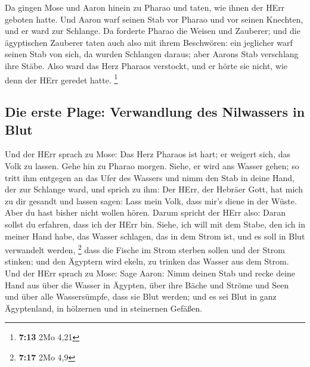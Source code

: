  Da gingen Mose und Aaron hinein zu Pharao und taten, wie
ihnen der HErr geboten hatte. Und Aaron warf seinen Stab vor Pharao und
vor seinen Knechten, und er ward zur Schlange.  Da
forderte Pharao die Weisen und Zauberer; und die ägyptischen Zauberer
taten auch also mit ihrem Beschwören:  ein jeglicher warf
seinen Stab von sich, da wurden Schlangen daraus; aber Aarons Stab
verschlang ihre Stäbe.  Also ward das Herz Pharaos
verstockt, und er hörte sie nicht, wie denn der HErr geredet hatte.
\footnote{\textbf{7:13} 2Mo 4,21}

\hypertarget{die-erste-plage-verwandlung-des-nilwassers-in-blut}{%
\subsection{Die erste Plage: Verwandlung des Nilwassers in
Blut}\label{die-erste-plage-verwandlung-des-nilwassers-in-blut}}

 Und der HErr sprach zu Mose: Das Herz Pharaos ist hart;
er weigert sich, das Volk zu lassen.  Gehe hin zu Pharao
morgen. Siehe, er wird ans Wasser gehen; so tritt ihm entgegen an das
Ufer des Wassers und nimm den Stab in deine Hand, der zur Schlange ward,
 und sprich zu ihm: Der HErr, der Hebräer Gott, hat mich
zu dir gesandt und lassen sagen: Lass mein Volk, dass mir's diene in der
Wüste. Aber du hast bisher nicht wollen hören.  Darum
spricht der HErr also: Daran sollst du erfahren, dass ich der HErr bin.
Siehe, ich will mit dem Stabe, den ich in meiner Hand habe, das Wasser
schlagen, das in dem Strom ist, und es soll in Blut verwandelt werden,
\footnote{\textbf{7:17} 2Mo 4,9}  dass die Fische im
Strom sterben sollen und der Strom stinken; und den Ägyptern wird ekeln,
zu trinken das Wasser aus dem Strom.  Und der HErr sprach
zu Mose: Sage Aaron: Nimm deinen Stab und recke deine Hand aus über die
Wasser in Ägypten, über ihre Bäche und Ströme und Seen und über alle
Wassersümpfe, dass sie Blut werden; und es sei Blut in ganz Ägyptenland,
in hölzernen und in steinernen Gefäßen.

